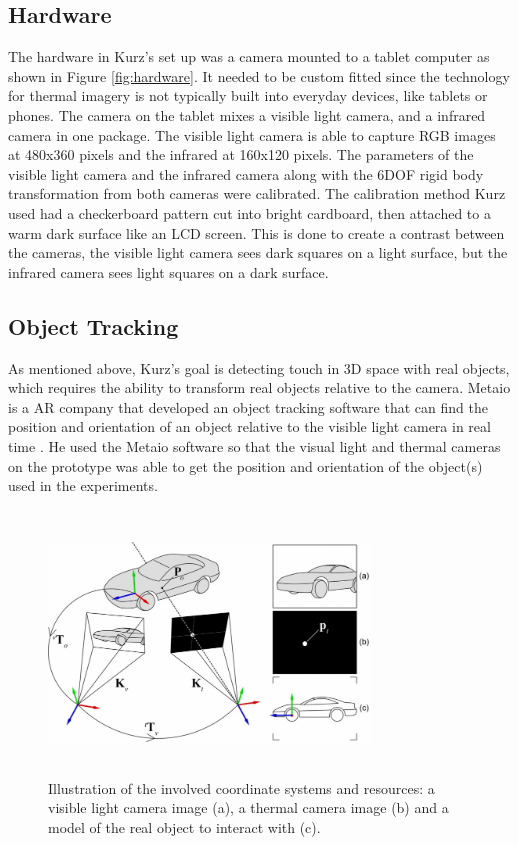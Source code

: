 \documentclass{sig-alternate}
\begin{document}
\subsection{Hardware}
\label{Hardware}
The hardware in Kurz's \cite{Thermal} set up was a camera mounted to a tablet computer as shown in Figure \ref{fig:hardware}. It needed to be custom fitted since the technology for thermal imagery is not typically built into everyday devices, like tablets or phones. The camera on the tablet mixes a visible light camera, and a infrared camera in one package. The visible light camera is able to capture RGB images at 480x360 pixels and the infrared at 160x120 pixels. The parameters of the visible light camera and the infrared camera along with the 6DOF rigid body transformation from both cameras were calibrated. The calibration method Kurz used had a checkerboard pattern cut into bright cardboard, then attached to a warm dark surface like an LCD screen. This is done to create a contrast between the cameras, the visible light camera sees dark squares on a light surface, but the infrared camera sees light squares on a dark surface.


\subsection{Object Tracking}
\label{Object Tracking}
As mentioned above,  Kurz's goal is detecting touch in 3D space with real objects, which requires the ability to transform real objects relative to the camera. Metaio is a AR company that developed an object tracking software that can find the position and orientation of an object relative to the visible light camera in real time \cite{Thermal}. He used the Metaio software so that the visual light and thermal cameras on the prototype was able to get the position and orientation of the object(s) used in the experiments.     

\begin{figure}
	\includegraphics[width=8.5cm, height=7cm]{Tracking}
	\caption{Illustration of the involved coordinate systems and resources: a visible light camera image (a), a thermal camera image (b) and a model of the real object to interact with (c).\cite{Thermal}}
	\label{fig:Tracking}
\end{figure}
\end{document}
